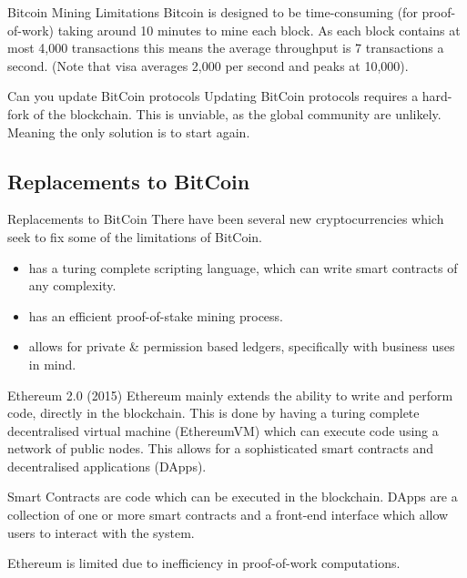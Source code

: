 \documentclass[11pt,a4paper]{article}
\begin{document}
  \begin{proposition}{Bitcoin Mining Limitations}
    Bitcoin is designed to be time-consuming (for proof-of-work) taking around 10 minutes to mine each block. As each block contains at most 4,000 transactions this means the average throughput is 7 transactions a second. (Note that visa averages 2,000 per second and peaks at 10,000).
  \end{proposition}

  \begin{proposition}{Can you update BitCoin protocols\?}
    Updating BitCoin protocols requires a hard-fork of the blockchain. This is unviable, as the global community are unlikely. Meaning the only solution is to start again.
  \end{proposition}

\subsection{Replacements to BitCoin}

  \begin{proposition}{Replacements to BitCoin}
    There have been several new cryptocurrencies which seek to fix some of the limitations of BitCoin.
    \begin{itemize}
      \item[\textit{Ethereum 2.0}] has a turing complete scripting language, which can write smart contracts of any complexity.
      \item[\textit{Cardano 3.0}] has an efficient proof-of-stake mining process.
      \item[\textit{HyperLedger Fabric}] allows for private \& permission based ledgers, specifically with business uses in mind.
    \end{itemize}
  \end{proposition}

  \begin{proposition}{Ethereum 2.0 (2015)}
    Ethereum mainly extends the ability to write and perform code, directly in the blockchain. This is done by having a turing complete decentralised virtual machine (EthereumVM) which can execute code using a network of public nodes. This allows for a sophisticated smart contracts and decentralised applications (DApps).
    \par Smart Contracts are code which can be executed in the blockchain. DApps are a collection of one or more smart contracts and a front-end interface which allow users to interact with the system.
    \par Ethereum is limited due to inefficiency in proof-of-work computations.
  \end{proposition}
\end{document}
